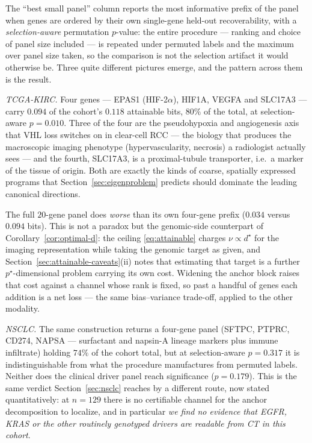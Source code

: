 \documentclass{article}
\begin{document}
The ``best small panel'' column reports the most informative prefix of the panel
when genes are ordered by their own single-gene held-out recoverability, with a
\emph{selection-aware} permutation $p$-value: the entire procedure --- ranking
and choice of panel size included --- is repeated under permuted labels and the
maximum over panel size taken, so the comparison is not the selection artifact
it would otherwise be. Three quite different pictures emerge, and the pattern
across them is the result.

\emph{TCGA-KIRC.} Four genes --- EPAS1 (HIF-2$\alpha$), HIF1A, VEGFA and
SLC17A3 --- carry $0.094$ of the cohort's $0.118$ attainable bits, $80\%$ of the
total, at selection-aware $p=0.010$. Three of the four are the pseudohypoxia and
angiogenesis axis that VHL loss switches on in clear-cell RCC --- the biology
that produces the macroscopic imaging phenotype (hypervascularity, necrosis) a
radiologist actually sees --- and the fourth, SLC17A3, is a proximal-tubule
transporter, i.e.\ a marker of the tissue of origin. Both are exactly the kinds
of coarse, spatially expressed programs that Section~\ref{sec:eigenproblem}
predicts should dominate the leading canonical directions.

The full $20$-gene panel does \emph{worse} than its own four-gene prefix
($0.034$ versus $0.094$ bits). This is not a paradox but the genomic-side
counterpart of Corollary~\ref{cor:optimal-d}: the ceiling
\eqref{eq:attainable} charges $\nu\propto d^\star$ for the imaging
representation while taking the genomic target as given, and
Section~\ref{sec:attainable-caveats}(ii) notes that estimating that target is a
further $p^\star$-dimensional problem carrying its own cost. Widening the anchor
block raises that cost against a channel whose rank is fixed, so past a handful
of genes each addition is a net loss --- the same bias--variance trade-off,
applied to the other modality.

\emph{NSCLC.} The same construction returns a four-gene panel (SFTPC, PTPRC,
CD274, NAPSA --- surfactant and napsin-A lineage markers plus immune infiltrate)
holding $74\%$ of the cohort total, but at selection-aware $p=0.317$ it is
indistinguishable from what the procedure manufactures from permuted labels.
Neither does the clinical driver panel reach significance ($p=0.179$). This is
the same verdict Section~\ref{sec:nsclc} reaches by a different route, now
stated quantitatively: at $n=129$ there is no certifiable channel for the anchor
decomposition to localize, and in particular \emph{we find no evidence that
EGFR, KRAS or the other routinely genotyped drivers are readable from CT in this
cohort}.
\end{document}
